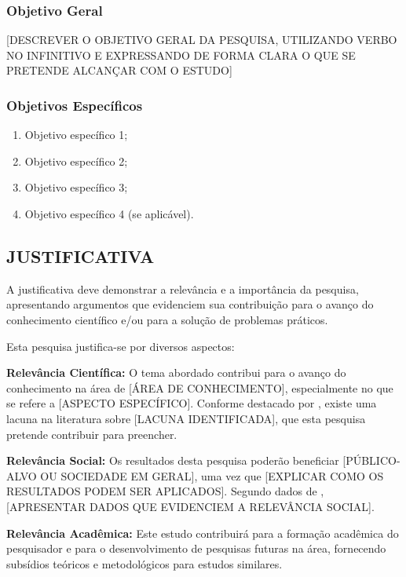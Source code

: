 \documentclass[
    12pt,        %
    openany,     %
    oneside,     %
    a4paper,     %
    english,     %
    french,      %
    spanish,     %
    brazil,      %
    article      %
]{abntex2}
\begin{document}
\subsubsection{Objetivo Geral}
\label{subsubsec:objetivo-geral}

[DESCREVER O OBJETIVO GERAL DA PESQUISA, UTILIZANDO VERBO NO INFINITIVO E EXPRESSANDO DE FORMA CLARA O QUE SE PRETENDE ALCANÇAR COM O ESTUDO]

\subsubsection{Objetivos Específicos}
\label{subsubsec:objetivos-especificos}

\begin{enumerate}
    \item Objetivo específico 1;
    \item Objetivo específico 2;
    \item Objetivo específico 3;
    \item Objetivo específico 4 (se aplicável).
\end{enumerate}


\subsection{JUSTIFICATIVA}
\label{subsec:justificativa}

A justificativa deve demonstrar a relevância e a importância da pesquisa, apresentando argumentos que evidenciem sua contribuição para o avanço do conhecimento científico e/ou para a solução de problemas práticos.

Esta pesquisa justifica-se por diversos aspectos:

\textbf{Relevância Científica:} O tema abordado contribui para o avanço do conhecimento na área de [ÁREA DE CONHECIMENTO], especialmente no que se refere a [ASPECTO ESPECÍFICO]. Conforme destacado por , existe uma lacuna na literatura sobre [LACUNA IDENTIFICADA], que esta pesquisa pretende contribuir para preencher.

\textbf{Relevância Social:} Os resultados desta pesquisa poderão beneficiar [PÚBLICO-ALVO OU SOCIEDADE EM GERAL], uma vez que [EXPLICAR COMO OS RESULTADOS PODEM SER APLICADOS]. Segundo dados de \cite{instituicao2023}, [APRESENTAR DADOS QUE EVIDENCIEM A RELEVÂNCIA SOCIAL].

\textbf{Relevância Acadêmica:} Este estudo contribuirá para a formação acadêmica do pesquisador e para o desenvolvimento de pesquisas futuras na área, fornecendo subsídios teóricos e metodológicos para estudos similares.
\end{document}
